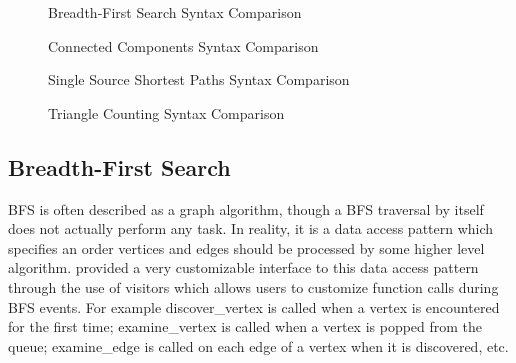 \begin{figure}[ht]
\noindent\begin{minipage}{.499\textwidth}
{\small
      
}
\end{minipage}\hfill
\begin{minipage}{.499\textwidth}
{\small
      
}
\end{minipage}
\caption{Breadth-First Search Syntax Comparison}
\label{fig:bfssyntax}
\end{figure}
\begin{figure}[ht]
\noindent\begin{minipage}{.499\textwidth}
{\small
      
}
\end{minipage}\hfill
\begin{minipage}{.499\textwidth}
{\small
      
}
\end{minipage}
\caption{Connected Components Syntax Comparison}
\label{fig:ccsyntax}
\end{figure}

\begin{figure}[ht]
\noindent\begin{minipage}{.499\textwidth}
{\small
      
}
\end{minipage}\hfill
\begin{minipage}{.499\textwidth}
{\small
      
}
\end{minipage}
\caption{Single Source Shortest Paths Syntax Comparison}
\label{fig:ssspsyntax}
\end{figure}

\begin{figure}[ht]
\noindent\begin{minipage}{.499\textwidth}
{\small
      
}
\end{minipage}\hfill
\begin{minipage}{.499\textwidth}
{\small
      
}
\end{minipage}
\caption{Triangle Counting Syntax Comparison}
\label{fig:tcsyntax}
\end{figure}

\subsection{Breadth-First Search}
BFS is often described as a graph algorithm, though a BFS traversal
by itself does not actually perform any task.
In reality, it is a data access pattern which specifies an order
vertices and edges should be processed by some higher level algorithm.
\bgl provided a very customizable interface to this
data access pattern through the use of visitors which allows users
to customize function calls during BFS events.
For example discover\_vertex is called when a vertex is encountered for the
first time; examine\_vertex is called when a vertex is popped from the queue;
examine\_edge is called on each edge of a vertex when it is discovered, etc.

